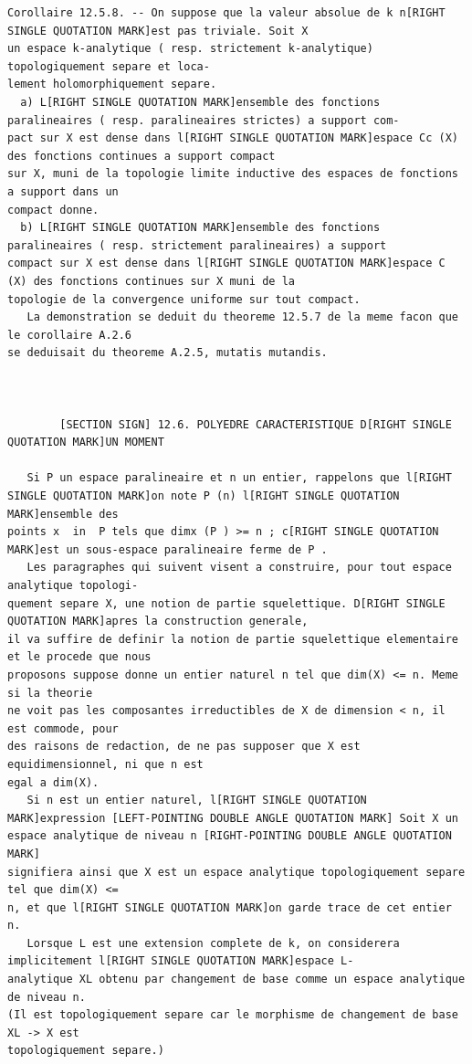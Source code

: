 \documentclass[
  11pt,
]{article}
\begin{document}
\begin{lstlisting}
Corollaire 12.5.8. -- On suppose que la valeur absolue de k n[RIGHT SINGLE QUOTATION MARK]est pas triviale. Soit X
un espace k-analytique ( resp. strictement k-analytique) topologiquement separe et loca-
lement holomorphiquement separe.
  a) L[RIGHT SINGLE QUOTATION MARK]ensemble des fonctions paralineaires ( resp. paralineaires strictes) a support com-
pact sur X est dense dans l[RIGHT SINGLE QUOTATION MARK]espace Cc (X) des fonctions continues a support compact
sur X, muni de la topologie limite inductive des espaces de fonctions a support dans un
compact donne.
  b) L[RIGHT SINGLE QUOTATION MARK]ensemble des fonctions paralineaires ( resp. strictement paralineaires) a support
compact sur X est dense dans l[RIGHT SINGLE QUOTATION MARK]espace C (X) des fonctions continues sur X muni de la
topologie de la convergence uniforme sur tout compact.
   La demonstration se deduit du theoreme 12.5.7 de la meme facon que le corollaire A.2.6
se deduisait du theoreme A.2.5, mutatis mutandis.



        [SECTION SIGN] 12.6. POLYEDRE CARACTERISTIQUE D[RIGHT SINGLE QUOTATION MARK]UN MOMENT

   Si P un espace paralineaire et n un entier, rappelons que l[RIGHT SINGLE QUOTATION MARK]on note P (n) l[RIGHT SINGLE QUOTATION MARK]ensemble des
points x  in  P tels que dimx (P ) >= n ; c[RIGHT SINGLE QUOTATION MARK]est un sous-espace paralineaire ferme de P .
   Les paragraphes qui suivent visent a construire, pour tout espace analytique topologi-
quement separe X, une notion de partie squelettique. D[RIGHT SINGLE QUOTATION MARK]apres la construction generale,
il va suffire de definir la notion de partie squelettique elementaire et le procede que nous
proposons suppose donne un entier naturel n tel que dim(X) <= n. Meme si la theorie
ne voit pas les composantes irreductibles de X de dimension < n, il est commode, pour
des raisons de redaction, de ne pas supposer que X est equidimensionnel, ni que n est
egal a dim(X).
   Si n est un entier naturel, l[RIGHT SINGLE QUOTATION MARK]expression [LEFT-POINTING DOUBLE ANGLE QUOTATION MARK] Soit X un espace analytique de niveau n [RIGHT-POINTING DOUBLE ANGLE QUOTATION MARK]
signifiera ainsi que X est un espace analytique topologiquement separe tel que dim(X) <=
n, et que l[RIGHT SINGLE QUOTATION MARK]on garde trace de cet entier n.
   Lorsque L est une extension complete de k, on considerera implicitement l[RIGHT SINGLE QUOTATION MARK]espace L-
analytique XL obtenu par changement de base comme un espace analytique de niveau n.
(Il est topologiquement separe car le morphisme de changement de base XL -> X est
topologiquement separe.)


\end{lstlisting}
\end{document}
